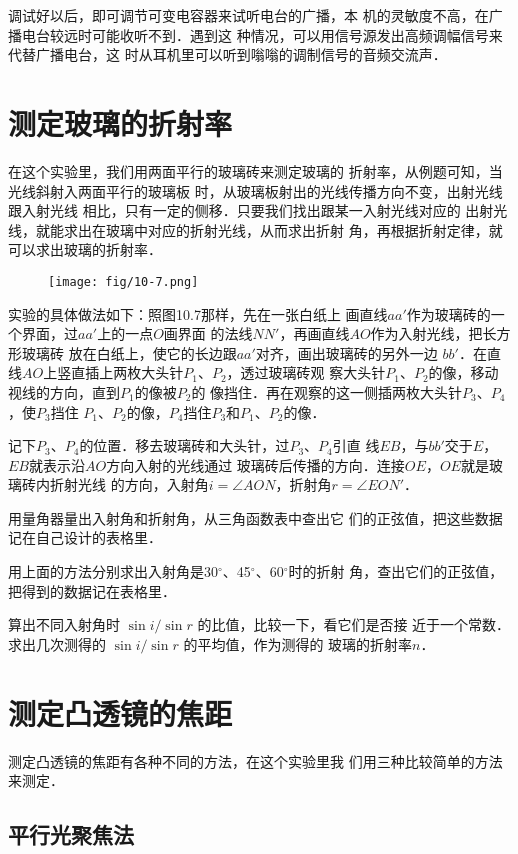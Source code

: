 调试好以后，即可调节可变电容器来试听电台的广播，本
机的灵敏度不高，在广播电台较远时可能收听不到．遇到这
种情况，可以用信号源发出高频调幅信号来代替广播电台，这
时从耳机里可以听到嗡嗡的调制信号的音频交流声．

\section{测定玻璃的折射率}

在这个实验里，我们用两面平行的玻璃砖来测定玻璃的
折射率，从例题可知，当光线斜射入两面平行的玻璃板
时，从玻璃板射出的光线传播方向不变，出射光线跟入射光线
相比，只有一定的侧移．只要我们找出跟某一入射光线对应的
出射光线，就能求出在玻璃中对应的折射光线，从而求出折射
角，再根据折射定律，就可以求出玻璃的折射率．
\begin{figure}[htp]\centering
    \texttt{[image: fig/10-7.png]}
    \caption{}
    \end{figure}

实验的具体做法如下：照图10.7那样，先在一张白纸上
画直线$aa'$作为玻璃砖的一个界面，过$aa'$上的一点$O$画界面
的法线$NN'$，再画直线$AO$作为入射光线，把长方形玻璃砖
放在白纸上，使它的长边跟$aa'$对齐，画出玻璃砖的另外一边
$bb'$．在直线$AO$上竖直插上两枚大头针$P_1$、$P_2$，透过玻璃砖观
察大头针$P_1$、$P_2$的像，移动视线的方向，直到$P_1$的像被$P_2$的
像挡住．再在观察的这一侧插两枚大头针$P_3$、$P_4$，使$P_3$挡住
$P_1$、$P_2$的像，$P_4$挡住$P_3$和$P_1$、$P_2$的像．


记下$P_3$、$P_4$的位置．移去玻璃砖和大头针，过$P_3$、$P_4$引直
线$EB$，与$bb'$交于$E$，$EB$就表示沿$AO$方向入射的光线通过
玻璃砖后传播的方向．连接$OE$，$OE$就是玻璃砖内折射光线
的方向，入射角$i=\angle AON$，折射角$r=\angle EON'$．

用量角器量出入射角和折射角，从三角函数表中查出它
们的正弦值，把这些数据记在自己设计的表格里．

用上面的方法分别求出入射角是30$^\circ$、45$^\circ$、60$^\circ$时的折射
角，查出它们的正弦值，把得到的数据记在表格里．

算出不同入射角时
$\sin i/\sin r$
的比值，比较一下，看它们是否接
近于一个常数．求出几次测得的
$\sin i/\sin r$
的平均值，作为测得的
玻璃的折射率$n$．

\section{测定凸透镜的焦距}
测定凸透镜的焦距有各种不同的方法，在这个实验里我
们用三种比较简单的方法来测定．

\subsection{平行光聚焦法}

